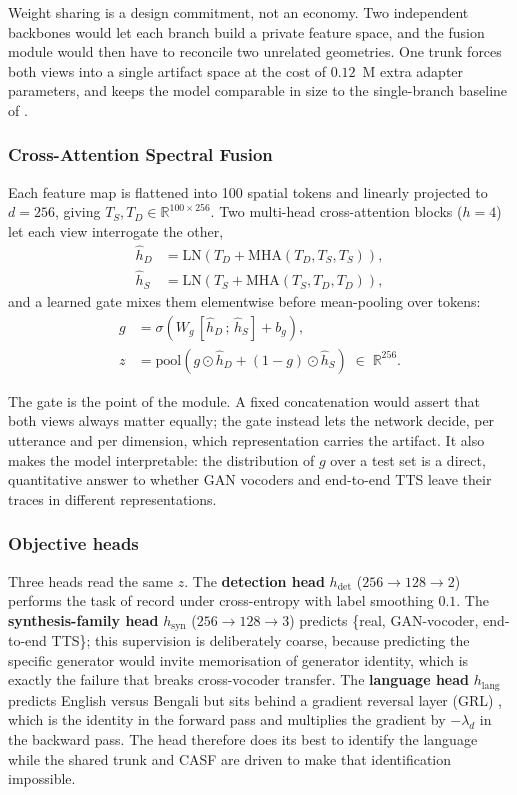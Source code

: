 \documentclass[conference]{IEEEtran}
\begin{document}
Weight sharing is a design commitment, not an economy. Two independent
backbones would let each branch build a private feature space, and the fusion
module would then have to reconcile two unrelated geometries. One trunk forces
both views into a single artifact space at the cost of $0.12$~M extra adapter
parameters, and keeps the model comparable in size to the single-branch
baseline of \cite{ahmed2026melspec}.

\subsubsection{Cross-Attention Spectral Fusion}
Each feature map is flattened into 100 spatial tokens and linearly projected
to $d = 256$, giving $T_S, T_D \in \mathbb{R}^{100 \times 256}$. Two
multi-head cross-attention blocks \cite{vaswani2017attention} ($h = 4$) let
each view interrogate the other,
\begin{align}
\hat{h}_D &= \mathrm{LN}\!\left(T_D + \mathrm{MHA}(T_D, T_S, T_S)\right),\\
\hat{h}_S &= \mathrm{LN}\!\left(T_S + \mathrm{MHA}(T_S, T_D, T_D)\right),
\end{align}
and a learned gate mixes them elementwise before mean-pooling over tokens:
\begin{align}
g &= \sigma\!\left(W_g\,[\hat{h}_D \,;\, \hat{h}_S] + b_g\right),\\
z &= \mathrm{pool}\!\left(g \odot \hat{h}_D + (1 - g) \odot \hat{h}_S\right)
\;\in\; \mathbb{R}^{256}.
\end{align}

The gate is the point of the module. A fixed concatenation would assert that
both views always matter equally; the gate instead lets the network decide,
per utterance and per dimension, which representation carries the artifact. It
also makes the model interpretable: the distribution of $g$ over a test set is
a direct, quantitative answer to whether GAN vocoders and end-to-end TTS leave
their traces in different representations.

\subsubsection{Objective heads}
Three heads read the same $z$. The \textbf{detection head} $h_{\mathrm{det}}$
($256 \rightarrow 128 \rightarrow 2$) performs the task of record under
cross-entropy with label smoothing $0.1$. The \textbf{synthesis-family head}
$h_{\mathrm{syn}}$ ($256 \rightarrow 128 \rightarrow 3$) predicts \{real,
GAN-vocoder, end-to-end TTS\}; this supervision is deliberately coarse,
because predicting the specific generator would invite memorisation of
generator identity, which is exactly the failure that breaks cross-vocoder
transfer. The \textbf{language head} $h_{\mathrm{lang}}$ predicts English
versus Bengali but sits behind a gradient reversal layer (GRL)
\cite{ganin2016dann}, which is the identity in the forward pass and multiplies
the gradient by $-\lambda_d$ in the backward pass. The head therefore does its
best to identify the language while the shared trunk and CASF are driven to
make that identification impossible.
\end{document}

